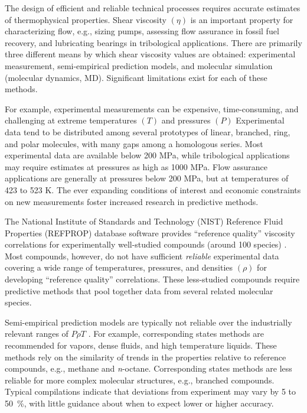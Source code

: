 \documentclass[preprint,review,12pt]{elsarticle}
\begin{document}
	The design of efficient and reliable technical processes requires accurate estimates of thermophysical properties. Shear viscosity $(\eta)$ is an important property for characterizing flow, e.g., sizing pumps, assessing flow assurance in fossil fuel recovery, and lubricating bearings in tribological applications. There are primarily three different means by which shear viscosity values are obtained: experimental measurement, semi-empirical prediction models, and molecular simulation (molecular dynamics, MD). Significant limitations exist for each of these methods. 
	
	For example, experimental measurements can be expensive, time-consuming, and challenging at extreme temperatures $(T)$ and pressures $(P)$ \cite{Assael1992,Zambrano2016} Experimental data tend to be distributed among several prototypes of linear, branched, ring, and polar molecules, with many gaps among a homologous series. Most experimental data are available below 200 MPa, while tribological applications may require estimates at pressures as high as 1000 MPa. Flow assurance applications are generally at pressures below 200 MPa, but at temperatures of 423 to 523 K. The ever expanding conditions of interest and economic constraints on new measurements foster increased research in predictive methods.
	
	
    
    The National Institute of Standards and Technology (NIST) Reference Fluid Properties (REFPROP) database software provides ``reference quality'' viscosity correlations for experimentally well-studied compounds (around 100 species) \cite{LEMMON-RP10}. Most compounds, however, do not have sufficient \textit{reliable} experimental data covering a wide range of temperatures, pressures, and densities $(\rho)$ for developing ``reference quality'' correlations. These less-studied compounds require predictive methods that pool together data from several related molecular species. 
    
    Semi-empirical prediction models are typically not reliable over the industrially relevant ranges of $P \rho T$ \cite{PGL}. For example, corresponding states methods are recommended for vapors, dense fluids, and high temperature liquids. These methods rely on the similarity of trends in the properties relative to reference compounds, e.g., methane and \textit{n}-octane. Corresponding states methods are less reliable for more complex molecular structures, e.g., branched compounds. Typical compilations indicate that deviations from experiment may vary by 5 to 50~\%, with little guidance about when to expect lower or higher accuracy. 
    
\end{document}
